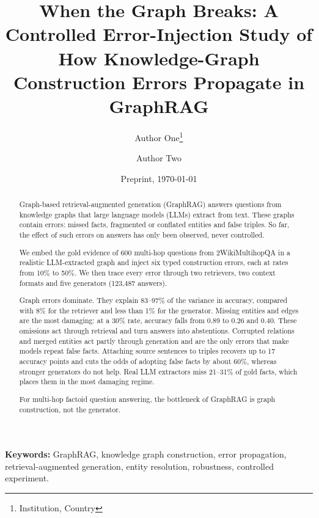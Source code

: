 \documentclass[11pt]{article}
\begin{document}
\title{When the Graph Breaks: A Controlled Error-Injection Study of How Knowledge-Graph Construction Errors Propagate in GraphRAG}
\author{Author One\thanks{Institution, Country} \and Author Two\footnotemark[1]}
\date{Preprint, \today}
\maketitle
\begin{abstract}
Graph-based retrieval-augmented generation (GraphRAG) answers questions from knowledge graphs that large language models (LLMs) extract from text. These graphs contain errors: missed facts, fragmented or conflated entities and false triples. So far, the effect of such errors on answers has only been observed, never controlled.

We embed the gold evidence of 600 multi-hop questions from 2WikiMultihopQA in a realistic LLM-extracted graph and inject six typed construction errors, each at rates from 10\% to 50\%. We then trace every error through two retrievers, two context formats and five generators (123,487 answers).

Graph errors dominate. They explain 83--97\% of the variance in accuracy, compared with 8\% for the retriever and less than 1\% for the generator. Missing entities and edges are the most damaging: at a 30\% rate, accuracy falls from 0.89 to 0.26 and 0.40. These omissions act through retrieval and turn answers into abstentions. Corrupted relations and merged entities act partly through generation and are the only errors that make models repeat false facts. Attaching source sentences to triples recovers up to 17 accuracy points and cuts the odds of adopting false facts by about 60\%, whereas stronger generators do not help. Real LLM extractors miss 21--31\% of gold facts, which places them in the most damaging regime.

For multi-hop factoid question answering, the bottleneck of GraphRAG is graph construction, not the generator.
\end{abstract}
\noindent\textbf{Keywords:} GraphRAG, knowledge graph construction, error propagation, retrieval-augmented generation, entity resolution, robustness, controlled experiment.
\end{document}
